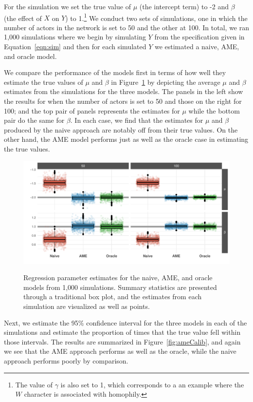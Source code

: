 For the simulation we set the true value of $\mu$ (the intercept term) to -2 and $\beta$ (the effect of $X$ on $Y$) to 1.\footnote{The value of $\gamma$ is also set to 1, which corresponds to a an example where the $W$ character is associated with homophily.} We conduct two sets of simulations, one in which the number of actors in the network is set to 50 and the other at 100. In total, we ran 1,000 simulations where we begin by simulating $Y$ from the specification given in Equation~\ref{eqn:sim} and then for each simulated $Y$ we estimated a naive, AME, and oracle model. 

We compare the performance of the models first in terms of how well they estimate the true values of $\mu$ and $\beta$ in Figure~\ref{fig:ameBias} by depicting the average $\mu$ and $\beta$ estimates from the simulations for the three models. The panels in the left show the results for when the number of actors is set to 50 and those on the right for 100; and the top pair of panels represents the estimates for $\mu$ while the bottom pair do the same for $\beta$. In each case, we find that the estimates for $\mu$ and $\beta$ produced by the naive approach are notably off from their true values. On the other hand, the AME model performs just as well as the oracle case in estimating the true values. 

\begin{figure}
	\centering
	\caption{Regression parameter estimates for the naive, AME, and oracle models from 1,000 simulations. Summary statistics are presented through a traditional box plot, and the estimates from each simulation are visualized as well as points.}
	\label{fig:ameBias}
	\includegraphics[width=1\textwidth]{ameSimBias_all.pdf} \\
\end{figure}

Next, we estimate the 95\% confidence interval for the three models in each of the simulations and estimate the proportion of times that the true value fell within those intervals. The results are summarized in Figure~\ref{fig:ameCalib}, and again we see that the AME approach performs as well as the oracle, while the naive approach performs poorly by comparison. 

